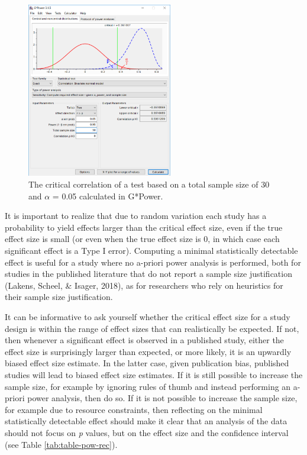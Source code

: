 \documentclass[
  english,
  ,jou,floatsintext]{apa6}
\begin{document}
\begin{figure}
\includegraphics[width=240px]{images/gpowcrit2} \caption{The critical correlation of a test based on a total sample size of 30 and $\alpha$ = 0.05 calculated in G*Power.}\label{fig:gcrit2}
\end{figure}

It is important to realize that due to random variation each study has a probability to yield effects larger than the critical effect size, even if the true effect size is small (or even when the true effect size is 0, in which case each significant effect is a Type I error). Computing a minimal statistically detectable effect is useful for a study where no a-priori power analysis is performed, both for studies in the published literature that do not report a sample size justification (Lakens, Scheel, \& Isager, 2018), as for researchers who rely on heuristics for their sample size justification.

It can be informative to ask yourself whether the critical effect size for a study design is within the range of effect sizes that can realistically be expected. If not, then whenever a significant effect is observed in a published study, either the effect size is surprisingly larger than expected, or more likely, it is an upwardly biased effect size estimate. In the latter case, given publication bias, published studies will lead to biased effect size estimates. If it is still possible to increase the sample size, for example by ignoring rules of thumb and instead performing an a-priori power analysis, then do so. If it is not possible to increase the sample size, for example due to resource constraints, then reflecting on the minimal statistically detectable effect should make it clear that an analysis of the data should not focus on \emph{p} values, but on the effect size and the confidence interval (see Table \ref{tab:table-pow-rec}).
\end{document}
